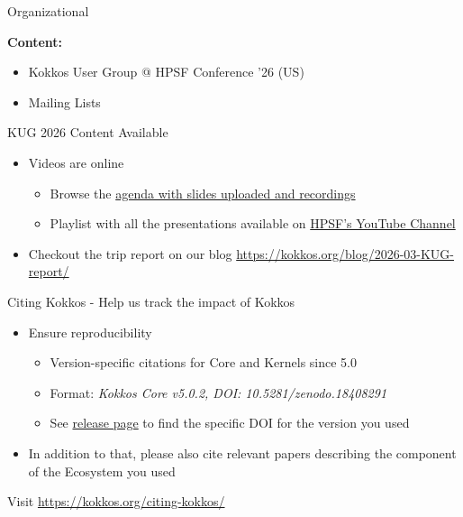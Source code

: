 

\begin{frame}[fragile]

  {\Huge Organizational}

  \vspace{15pt}

  \textbf{Content:}
  \begin{itemize}
    \item Kokkos User Group @ HPSF Conference '26 (US)
    \item Mailing Lists
  \end{itemize}

\end{frame}


\begin{frame}[fragile]{KUG 2026 Content Available}


\begin{itemize}
\item Videos are online
  \begin{itemize}
  \item Browse the \href{https://hpsf2026.sched.com/overview/type/Kokkos+Project+Meeting}{agenda with slides uploaded and recordings}
  \item Playlist with all the presentations available on \href{https://youtube.com/playlist?list=PLRKq_yxxHw28Ttz9noQiGQglDlZhUFHJ4&si=v-O6KetKLGRQ4h7V}{HPSF's YouTube Channel}
  \end{itemize}
\item Checkout the trip report on our blog \url{https://kokkos.org/blog/2026-03-KUG-report/}
\end{itemize}

\end{frame}


\begin{frame}[fragile]{Citing Kokkos - Help us track the impact of Kokkos}

\begin{itemize}
\item Ensure reproducibility
  \begin{itemize}
  \item Version-specific citations for Core and Kernels since 5.0
  \item Format: \emph{Kokkos Core v5.0.2, DOI: 10.5281/zenodo.18408291}
  \item See \href{https://kokkos.org/about/releases/}{release page} to find the specific DOI for the version you used
  \end{itemize}
\item In addition to that, please also cite relevant papers describing the component of the Ecosystem you used
\end{itemize}

Visit \url{https://kokkos.org/citing-kokkos/}

\end{frame}


